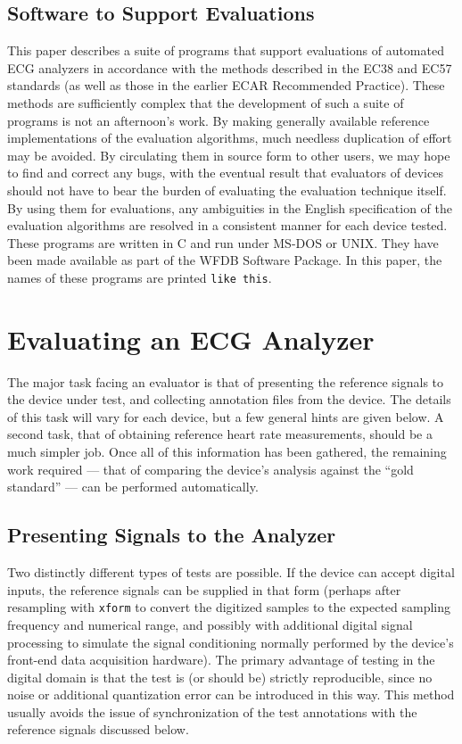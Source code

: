 \documentclass[twoside]{article}
\begin{document}
\subsection{Software to Support Evaluations}
This paper describes a suite of programs that support evaluations of
automated ECG analyzers in accordance with the methods described in
the EC38 and EC57 standards (as well as those in the earlier ECAR
Recommended Practice).  These methods are sufficiently complex that
the development of such a suite of programs is not an afternoon's
work.  By making generally available reference implementations of the
evaluation algorithms, much needless duplication of effort may be
avoided.  By circulating them in source form to other users, we may
hope to find and correct any bugs, with the eventual result that
evaluators of devices should not have to bear the burden of evaluating
the evaluation technique itself.  By using them for evaluations, any
ambiguities in the English specification of the evaluation algorithms
are resolved in a consistent manner for each device tested.  These
programs are written in C and run under MS-DOS or UNIX.  They have
been made available as part of the WFDB Software Package.  In this
paper, the names of these programs are printed {\tt like this}.

\section{Evaluating an ECG Analyzer}
The major task facing an evaluator is that of presenting the reference signals
to the device under test, and collecting annotation files from the device.  The
details of this task will vary for each device, but a few general hints are
given below.  A second task, that of obtaining reference heart rate
measurements, should be a much simpler job.  Once all of this information has
been gathered, the remaining work required --- that of comparing the device's
analysis against the ``gold standard'' --- can be performed automatically.

\subsection{Presenting Signals to the Analyzer}
Two distinctly different types of tests are possible.  If the device can accept
digital inputs, the reference signals can be supplied in that form (perhaps
after resampling with {\tt xform} to convert the digitized samples to the
expected sampling frequency and numerical range, and possibly with additional
digital signal processing to simulate the signal conditioning normally
performed by the device's front-end data acquisition hardware).  The primary
advantage of testing in the digital domain is that the test is (or should be)
strictly reproducible, since no noise or additional quantization error can be
introduced in this way.  This method usually avoids the issue of
synchronization of the test annotations with the reference signals discussed
below.
\end{document}
